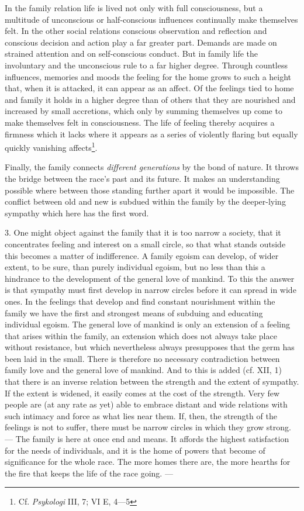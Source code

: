\documentclass[12pt,a4paper,openany]{book}
\newcommand{\opage}[1]{\marginnote{\footnotesize\textit{[#1]}}}
\begin{document}
In the family relation life is lived not only with full consciousness, but a multitude of unconscious or half-conscious
influences continually make themselves felt. In the other social relations conscious observation and reflection and
conscious decision and action play a far greater part. Demands are made on strained attention and on self-conscious
conduct. But in family life the involuntary and the unconscious rule to a far higher degree. Through countless
influences, memories and moods the feeling for the home grows to such a height that, when it is attacked, it can appear
as an affect. Of the feelings tied to home and family it holds in a higher degree than of others that they are
nourished and increased by small accretions, which only by summing themselves up come to make themselves felt in
consciousness. The life of feeling thereby acquires a firmness which it
\opage{280}lacks where it appears as a series of violently flaring but equally quickly vanishing
affects\footnote[1]{Cf. \textit{Psykologi} III, 7; VI E, 4---5}.

Finally, the family connects \textit{different generations} by the bond of nature. It throws the bridge between the
race's past and its future. It makes an understanding possible where between those standing further apart it would be
impossible. The conflict between old and new is subdued within the family by the deeper-lying sympathy which here has
the first word.

3. One might object against the family that it is too narrow a society, that it concentrates feeling and interest on a
small circle, so that what stands outside this becomes a matter of indifference. A family egoism can develop, of wider
extent, to be sure, than purely individual egoism, but no less than this a hindrance to the development of the general
love of mankind. To this the answer is that sympathy must first develop in narrow circles before it can spread in wide
ones. In the feelings that develop and find constant nourishment within the family we have the first and strongest
means of subduing and educating individual egoism. The general love of mankind is only an extension of a feeling that
arises within the family, an extension which does not always take place without resistance, but which nevertheless
always presupposes that the germ has been laid in the small. There is therefore no necessary contradiction between
family love and the general love of mankind. And to this is added (cf. XII, 1) that there is an inverse relation
between the strength and the extent of sympathy. If the extent is widened, it easily comes at the cost of the strength.
Very few people are (at any rate as yet) able to embrace distant and wide relations with such intimacy and force as what
lies near them. If, then, the strength of the feelings is not to suffer, there must be narrow circles in which they grow
strong. --- The family is here at once end and means. It affords the highest satisfaction for the needs of individuals,
and it is the home of powers that become of significance for the whole race. The
\opage{281}more homes there are, the more hearths for the fire that keeps the life of the race going. ---
\end{document}
